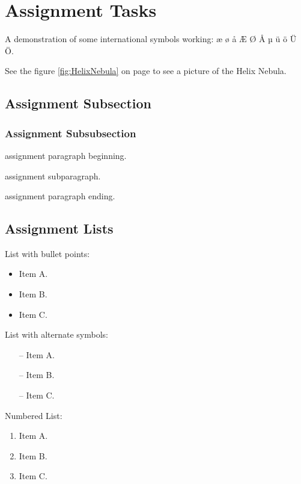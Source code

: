 \documentclass[
english, %
headsepline, %
]{scrartcl} %
\begin{document}
\tableofcontents %

\listoffigures %

\listoftables %

\section{Assignment Tasks} 
\label{sec:Assignment Tasks}
    A demonstration of some international symbols working: æ ø å Æ Ø Å µ ü ö Ü Ö.

    See the figure \ref{fig:HelixNebula} on page \pageref{fig:HelixNebula} to see a picture of the Helix Nebula.
 \subsection{Assignment Subsection}
 \label{sec:Assignment Subsection}
    \subsubsection{Assignment Subsubsection}
    \label{sec:Assignment Subsubsection}
        \begin{paragraph}           
            assignment paragraph beginning.
            \begin{subparagraph}
                assignment subparagraph.\\
            \end{subparagraph}
            assignment paragraph ending.
        \end{paragraph}

    \subsection{Assignment Lists}
        List with bullet points:
        \begin{itemize}
            \item Item A.
            \item Item B.
            \item Item C.
        \end{itemize}
        List with alternate symbols:
        \begin{itemize}
            \item[--] Item A.
            \item[--] Item B.
            \item[--] Item C.
        \end{itemize}
        Numbered List:
        \begin{enumerate}
            \item Item A.
            \item Item B.
            \item Item C.
        \end{enumerate}
\end{document}

